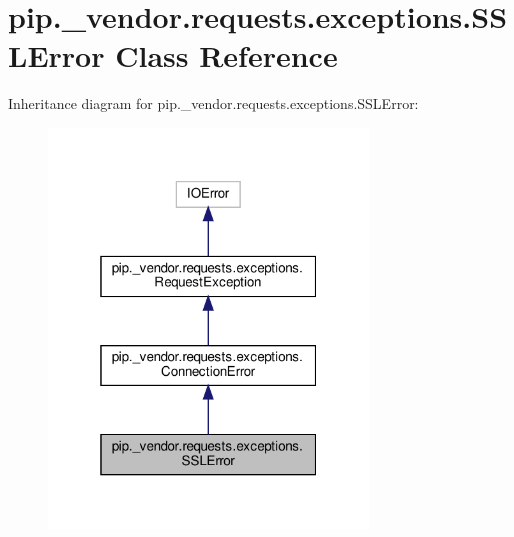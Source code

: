 \hypertarget{classpip_1_1__vendor_1_1requests_1_1exceptions_1_1SSLError}{}\section{pip.\+\_\+vendor.\+requests.\+exceptions.\+S\+S\+L\+Error Class Reference}
\label{classpip_1_1__vendor_1_1requests_1_1exceptions_1_1SSLError}


Inheritance diagram for pip.\+\_\+vendor.\+requests.\+exceptions.\+S\+S\+L\+Error\+:
\nopagebreak
\begin{figure}[H]
\begin{center}
\leavevmode
\includegraphics[width=241pt]{classpip_1_1__vendor_1_1requests_1_1exceptions_1_1SSLError__inherit__graph}
\end{center}
\end{figure}


